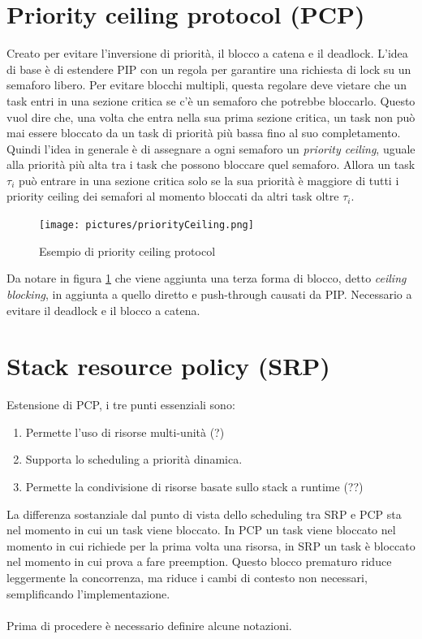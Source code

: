 \documentclass[12pt,openany,onesided]{book}
\begin{document}
\section{Priority ceiling protocol (PCP)}
Creato per evitare l'inversione di priorità, il blocco a catena e il deadlock.
L'idea di base è di estendere PIP con un regola per garantire una richiesta di lock su un semaforo libero.
Per evitare blocchi multipli, questa regolare deve vietare che un task entri in una sezione critica se c'è un semaforo che potrebbe bloccarlo.
Questo vuol dire che, una volta che entra nella sua prima sezione critica, un task non può mai essere bloccato da un task di priorità più bassa fino al suo completamento.
Quindi l'idea in generale è di assegnare a ogni semaforo un \textit{priority ceiling}, uguale alla priorità più alta tra i task che possono bloccare quel semaforo.
Allora un task $\tau_i$ può entrare in una sezione critica solo se la sua priorità è maggiore di tutti i priority ceiling dei semafori al momento bloccati da altri task oltre $\tau_i$.
\begin{figure}
    \centering
    \texttt{[image: pictures/priorityCeiling.png]}
    \caption{Esempio di priority ceiling protocol}
    \label{fig:priorityCeilingProtocol}
\end{figure}
Da notare in figura \ref{fig:priorityCeilingProtocol} che viene aggiunta una terza forma di blocco, detto \textit{ceiling blocking}, in aggiunta a quello diretto e push-through causati da PIP.
Necessario a evitare il deadlock e il blocco a catena.
\section{Stack resource policy (SRP)}
Estensione di PCP, i tre punti essenziali sono:
\begin{enumerate}
    \item Permette l'uso di risorse multi-unità (?)
    \item Supporta lo scheduling a priorità dinamica.
    \item Permette la condivisione di risorse basate sullo stack a runtime (??)
\end{enumerate}
La differenza sostanziale dal punto di vista dello scheduling tra SRP e PCP sta nel momento in cui un task viene bloccato.
In PCP un task viene bloccato nel momento in cui richiede per la prima volta una risorsa, in SRP un task è bloccato nel momento in cui prova a fare preemption.
Questo blocco prematuro riduce leggermente la concorrenza, ma riduce i cambi di contesto non necessari, semplificando l'implementazione.\\\\
Prima di procedere è necessario definire alcune notazioni.
\end{document}
